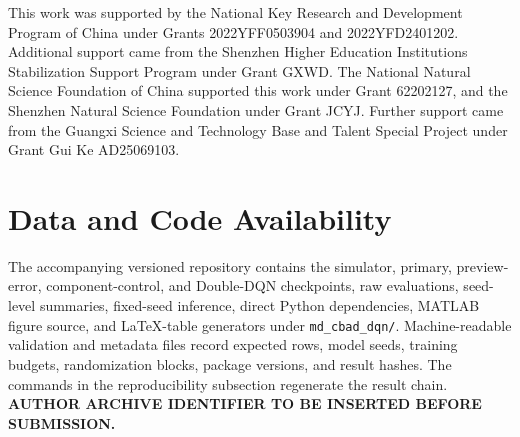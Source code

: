\documentclass[11pt]{article}
\begin{document}
This work was supported by the National Key Research and Development Program of China under Grants 2022YFF0503904 and 2022YFD2401202. Additional support came from the Shenzhen Higher Education Institutions Stabilization Support Program under Grant GXWD. The National Natural Science Foundation of China supported this work under Grant 62202127, and the Shenzhen Natural Science Foundation under Grant JCYJ. Further support came from the Guangxi Science and Technology Base and Talent Special Project under Grant Gui Ke AD25069103.

\section*{Data and Code Availability}

The accompanying versioned repository contains the simulator, primary, preview-error, component-control, and Double-DQN checkpoints, raw evaluations, seed-level summaries, fixed-seed inference, direct Python dependencies, MATLAB figure source, and LaTeX-table generators under \texttt{md\_cbad\_dqn/}. Machine-readable validation and metadata files record expected rows, model seeds, training budgets, randomization blocks, package versions, and result hashes. The commands in the reproducibility subsection regenerate the result chain. \textbf{AUTHOR ARCHIVE IDENTIFIER TO BE INSERTED BEFORE SUBMISSION.}

\begingroup
\small
\setlength{\itemsep}{0.2em}


\endgroup
\end{document}
